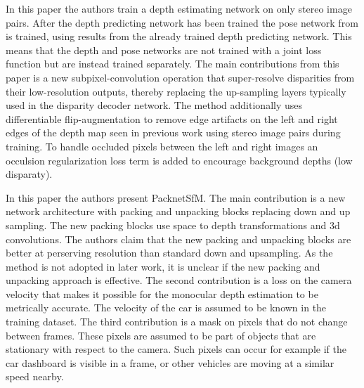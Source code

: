In this paper\cite{superdepth} the authors train a depth estimating network on only stereo image pairs. After the depth predicting network has been trained the pose network from \cite{sfmlearner} is trained, using results from the already trained depth predicting network. This means that the depth and pose networks are not trained with a joint loss function but are instead trained separately. The main contributions from this paper is a new subpixel-convolution operation that super-resolve disparities from their low-resolution outputs, thereby replacing the up-sampling layers typically used in the disparity decoder network. The method additionally uses differentiable flip-augmentation to remove edge artifacts on the left and right edges of the depth map seen in previous work using stereo image pairs during training. To handle occluded pixels between the left and right images an occulsion regularization loss term is added to encourage background depths (low disparaty).


In this paper\cite{packnet} the authors present PacknetSfM. The main contribution is a new network architecture with packing and unpacking blocks replacing down and up sampling. The new packing blocks use space to depth transformations and 3d convolutions. The authors claim that the new packing and unpacking blocks are better at perserving resolution than standard down and upsampling. As the method is not adopted in later work, it is unclear if the new packing and unpacking approach is effective. The second contribution is a loss on the camera velocity that makes it possible for the monocular depth estimation to be metrically accurate. The velocity of the car is assumed to be known in the training dataset. The third contribution is a mask on pixels that do not change between frames. These pixels are assumed to be part of objects that are stationary with respect to the camera. Such pixels can occur for example if the car dashboard is visible in a frame, or other vehicles are moving at a similar speed nearby.


